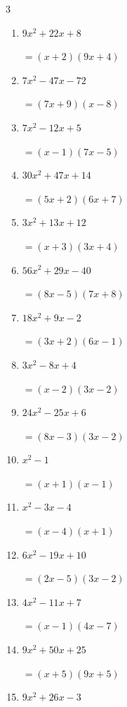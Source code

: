 \begin{multicols}{3}
\begin{enumerate}
\columnbreak %

\resetques

  \item $9x^{2}+22x+8$

        $=(x+2)(9x+4)$

  \item $7x^{2}-47x-72$

        $=(7x+9)(x-8)$

  \item $7x^{2}-12x+5$

        $=(x-1)(7x-5)$

  \item $30x^{2}+47x+14$

        $=(5x+2)(6x+7)$

  \item $3x^{2}+13x+12$

        $=(x+3)(3x+4)$

  \item $56x^{2}+29x-40$

        $=(8x-5)(7x+8)$

  \item $18x^{2}+9x-2$

        $=(3x+2)(6x-1)$

  \item $3x^{2}-8x+4$

        $=(x-2)(3x-2)$

  \item $24x^{2}-25x+6$

        $=(8x-3)(3x-2)$

  \item $x^{2}-1$

        $=(x+1)(x-1)$

\columnbreak %

  \item $x^{2}-3x-4$

        $=(x-4)(x+1)$

  \item $6x^{2}-19x+10$

        $=(2x-5)(3x-2)$

  \item $4x^{2}-11x+7$

        $=(x-1)(4x-7)$

  \item $9x^{2}+50x+25$

        $=(x+5)(9x+5)$

  \item $9x^{2}+26x-3$


\end{enumerate}
\end{multicols}
